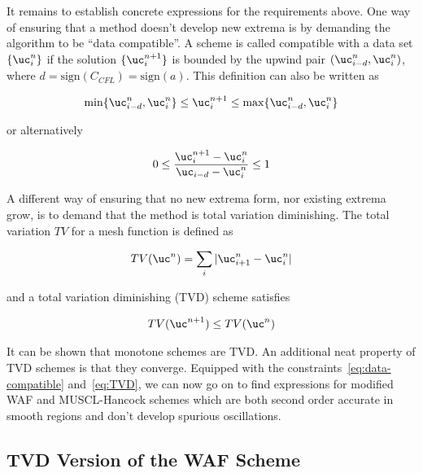 It remains to establish concrete expressions for the requirements above. One way of ensuring that
a method doesn't develop new extrema is by demanding the algorithm to be ``data compatible''. A
scheme is called compatible with a data set $\{\uc_i^n\}$ if the solution $\{\uc_i^{n+1}\}$ is
bounded by the upwind pair $(\uc_{i-d}^n, \uc_i^n)$, where $d = \text{sign}(C_{CFL}) =
\text{sign}(a)$. This definition can also be written as

\begin{align}
    \min\{\uc_{i-d}^n, \uc_i^n\} \leq \uc_i^{n+1} \leq \max\{\uc_{i-d}^n, \uc_i^n\}
\end{align}

or alternatively

\begin{align}
    0 \leq \frac{\uc_i^{n+1} - \uc_i^n}{\uc_{i-d} - \uc_i^n} \leq 1 \label{eq:data-compatible}
\end{align}

A different way of ensuring that no new extrema form, nor existing extrema grow, is to demand that
the method is total variation diminishing. The total variation $TV$ for a mesh function is defined
as

\begin{align}
    TV(\uc^n) = \sum_i |\uc_{i+1}^n - \uc_i^n |
\end{align}

and a total variation diminishing (TVD) scheme satisfies

\begin{align}
    TV(\uc^{n+1}) \leq TV(\uc^{n}) \label{eq:TVD}
\end{align}

It can be shown that monotone schemes are TVD. An additional neat property of TVD schemes is that
they converge. Equipped with the constraints~\ref{eq:data-compatible} and~\ref{eq:TVD}, we can now
go on to find expressions for modified WAF and MUSCL-Hancock schemes which are both second order
accurate in smooth regions and don't develop spurious oscillations.














\subsection{TVD Version of the WAF Scheme}\label{chap:WAF-tvd-linear-advection}


